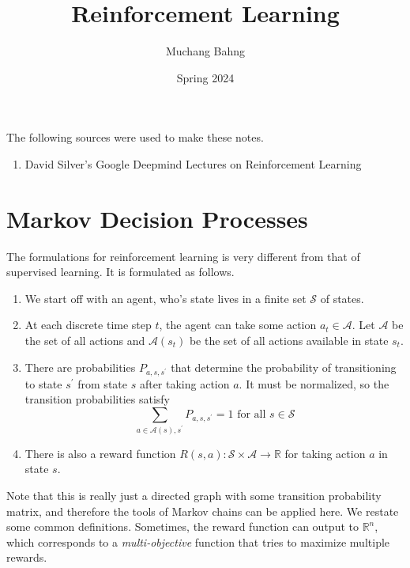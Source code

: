 \documentclass{article}
\begin{document}
\title{Reinforcement Learning}
\author{Muchang Bahng}
\date{Spring 2024}

\maketitle
\tableofcontents
\pagebreak

The following sources were used to make these notes. 
\begin{enumerate}
  \item David Silver's Google Deepmind Lectures on Reinforcement Learning 
\end{enumerate}

\section{Markov Decision Processes}

  \begin{definition}
    The formulations for reinforcement learning is very different from that of supervised learning. It is formulated as follows. 
    \begin{enumerate}
      \item We start off with an agent, who's state lives in a finite set $\mathcal{S}$ of states. 
      \item At each discrete time step $t$, the agent can take some action $a_t \in \mathcal{A}$. Let $\mathcal{A}$ be the set of all actions and $\mathcal{A}(s_t)$ be the set of all actions available in state $s_t$. 
      \item There are probabilities $P_{a, s, s^\prime}$ that determine the probability of transitioning to state $s^\prime$ from state $s$ after taking action $a$. It must be normalized, so the transition probabilities satisfy 
        \begin{equation}
          \sum_{a \in \mathcal{A}(s), s^\prime} P_{a, s, s^\prime} = 1 \text{ for all } s \in \mathcal{S}
        \end{equation}
      \item There is also a reward function $R(s, a): \mathcal{S} \times \mathcal{A} \rightarrow \mathbb{R}$ for taking action $a$ in state $s$. 
    \end{enumerate}
  \end{definition}

  Note that this is really just a directed graph with some transition probability matrix, and therefore the tools of Markov chains can be applied here. We restate some common definitions. Sometimes, the reward function can output to $\mathbb{R}^n$, which corresponds to a \textit{multi-objective} function that tries to maximize multiple rewards. 
\end{document}
